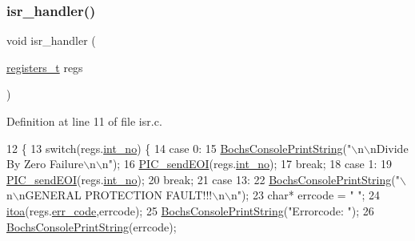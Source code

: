 \subsubsection{\texorpdfstring{isr\+\_\+handler()}{isr\_handler()}}
{\footnotesize\ttfamily void isr\+\_\+handler (\begin{DoxyParamCaption}\item[{\hyperlink{a00083_adf58dbaf6139b4957c348711f2026957_adf58dbaf6139b4957c348711f2026957}{registers\+\_\+t}}]{regs }\end{DoxyParamCaption})}



Definition at line 11 of file isr.\+c.


\begin{DoxyCode}
12 \{
13     \textcolor{keywordflow}{switch}(regs.\hyperlink{a00171_af311750a9b18afb3b1ed2d144fbe1cb0_af311750a9b18afb3b1ed2d144fbe1cb0}{int\_no}) \{
14         \textcolor{keywordflow}{case} 0:
15             \hyperlink{a00050_a19e1f554d03c977f8b947f21489daa41_a19e1f554d03c977f8b947f21489daa41}{BochsConsolePrintString}(\textcolor{stringliteral}{"\(\backslash\)n\(\backslash\)nDivide By Zero Failure\(\backslash\)n\(\backslash\)n"});
16             \hyperlink{a00029_a1119739f7932598c83c3f8ce42a649de_a1119739f7932598c83c3f8ce42a649de}{PIC\_sendEOI}(regs.\hyperlink{a00171_af311750a9b18afb3b1ed2d144fbe1cb0_af311750a9b18afb3b1ed2d144fbe1cb0}{int\_no});
17             \textcolor{keywordflow}{break};
18         \textcolor{keywordflow}{case} 1:
19             \hyperlink{a00029_a1119739f7932598c83c3f8ce42a649de_a1119739f7932598c83c3f8ce42a649de}{PIC\_sendEOI}(regs.\hyperlink{a00171_af311750a9b18afb3b1ed2d144fbe1cb0_af311750a9b18afb3b1ed2d144fbe1cb0}{int\_no});
20             \textcolor{keywordflow}{break};
21         \textcolor{keywordflow}{case} 13:
22             \hyperlink{a00050_a19e1f554d03c977f8b947f21489daa41_a19e1f554d03c977f8b947f21489daa41}{BochsConsolePrintString}(\textcolor{stringliteral}{"\(\backslash\)n\(\backslash\)nGENERAL PROTECTION FAULT!!!\(\backslash\)n\(\backslash\)n"});
23             \textcolor{keywordtype}{char}* errcode = \textcolor{stringliteral}{"  "};
24             \hyperlink{a00092_af749add1ff19b6ff96a62f35ebb49b7e_af749add1ff19b6ff96a62f35ebb49b7e}{itoa}(regs.\hyperlink{a00171_a1f90b3d484c66002c9ffcd0e54e97c2c_a1f90b3d484c66002c9ffcd0e54e97c2c}{err\_code},errcode);
25             \hyperlink{a00050_a19e1f554d03c977f8b947f21489daa41_a19e1f554d03c977f8b947f21489daa41}{BochsConsolePrintString}(\textcolor{stringliteral}{"Errorcode: "});
26             \hyperlink{a00050_a19e1f554d03c977f8b947f21489daa41_a19e1f554d03c977f8b947f21489daa41}{BochsConsolePrintString}(errcode);

\end{DoxyCode}
